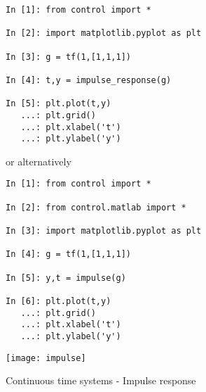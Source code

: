 \begin{figure}[htbp]	%
\begin{minipage}[t]{0.55\textwidth}
  \vspace{0pt}
\begin{lstlisting}[linewidth=7cm,xleftmargin=0cm]
In [1]: from control import *

In [2]: import matplotlib.pyplot as plt

In [3]: g = tf(1,[1,1,1])

In [4]: t,y = impulse_response(g)

In [5]: plt.plot(t,y)
   ...: plt.grid()
   ...: plt.xlabel('t')
   ...: plt.ylabel('y')
\end{lstlisting}

or alternatively

\begin{lstlisting}[linewidth=7cm,xleftmargin=0cm]
In [1]: from control import *

In [2]: from control.matlab import *

In [3]: import matplotlib.pyplot as plt

In [4]: g = tf(1,[1,1,1])

In [5]: y,t = impulse(g)

In [6]: plt.plot(t,y)
   ...: plt.grid()
   ...: plt.xlabel('t')
   ...: plt.ylabel('y')
\end{lstlisting}
\end{minipage}%
\begin{minipage}[t]{0.5\textwidth}
  \vspace{0pt} \centering
  \texttt{[image: impulse]}
\end{minipage}
\caption{Continuous time systems - Impulse response}
\label{F4}
\end{figure}

